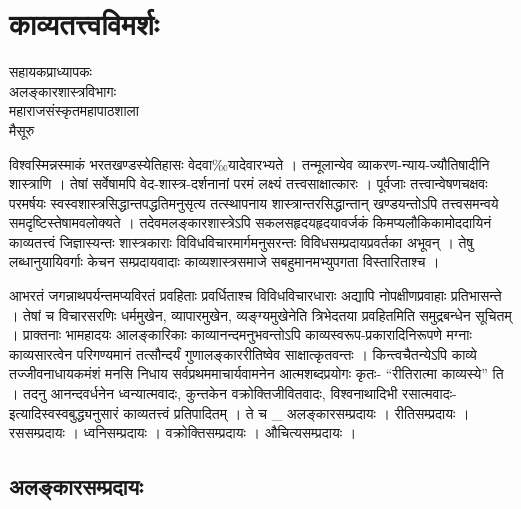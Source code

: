 {\fontsize{15}{17}\selectfont
\chapter{काव्यतत्त्वविमर्शः}

\begin{center}
\smallskip

सहायकप्राध्यापकः\\
अलङ्कारशास्त्रविभागः\\
महाराजसंस्कृतमहापाठशाला\\
मैसूरु
\addrule
\end{center}
विश्वस्मिन्नस्माकं भरतखण्डस्येतिहासः वेदवा$‰$यादेवारभ्यते । तन्मूलान्येव व्याकरण-न्याय-ज्यौतिषादीनि शास्त्राणि । तेषां सर्वेषामपि वेद-शास्त्र-दर्शनानां परमं लक्ष्यं तत्त्वसाक्षात्कारः । पूर्वजाः तत्त्वान्वेषणचक्षवः परमर्षयः स्वस्वशास्त्रसिद्धान्तपद्धतिमनुसृत्य तत्स्थापनाय शास्त्रान्तरसिद्धान्तान् खण्डयन्तोऽपि तत्त्वसमन्वये समदृष्टिस्तेषामवलोक्यते ।  तदेवमलङ्कारशास्त्रेऽपि सकलसहृदयहृदयावर्जकं किमप्यलौकिकामोददायिनं काव्यतत्त्वं जिज्ञास्यन्तः शास्त्रकाराः विविधविचारमार्गमनुसरन्तः विविधसम्प्रदायप्रवर्तका अभूवन् । तेषु लब्धानुयायिवर्गाः केचन सम्प्रदायवादाः काव्यशास्त्रसमाजे सबहुमानमभ्युपगता विस्तारिताश्च ।

आभरतं जगन्नाथपर्यन्तमप्यविरतं प्रवहिताः प्रवर्धिताश्च विविधविचारधाराः अद्यापि नोपक्षीणप्रवाहाः प्रतिभासन्ते । तेषां च विचारसरणिः धर्ममुखेन, व्यापारमुखेन, व्यङ्ग्यमुखेनेति त्रिभेदतया प्रवहितमिति समुद्रबन्धेन सूचितम् । प्राक्तनाः भामहादयः आलङ्कारिकाः काव्यानन्दमनुभवन्तोऽपि काव्यस्वरूप-प्रकारादिनिरूपणे मग्नाः काव्यसारत्वेन परिगण्यमानं तत्सौन्दर्यं गुणालङ्काररीतिष्वेव साक्षात्कृतवन्तः । किन्त्वचैतन्येऽपि काव्ये तज्जीवनाधायकमंशं मनसि निधाय सर्वप्रथममाचार्यवामनेन आत्मशब्दप्रयोगः कृतः- “रीतिरात्मा काव्यस्ये” ति ।  तदनु आनन्दवर्धनेन ध्वन्यात्मवादः, कुन्तकेन वक्रोक्तिजीवितवादः, विश्वनाथादिभी रसात्मवादः- इत्यादिस्वस्वबुद्ध्यनुसारं काव्यतत्त्वं प्रतिपादितम् । ते च \_    अलङ्कारसम्प्रदायः ।     रीतिसम्प्रदायः ।	     रससम्प्रदायः ।   ध्वनिसम्प्रदायः ।	   वक्रोक्तिसम्प्रदायः ।   औचित्यसम्प्रदायः ।

\section*{ अलङ्कारसम्प्रदायः}

}
